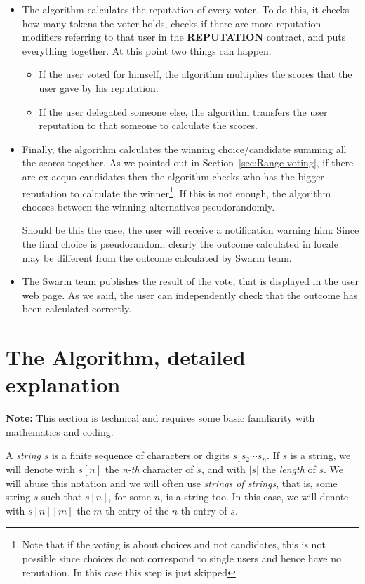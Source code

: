 \documentclass[submission, copyright,creativecommons,sharealike,noncommercial]{eptcs}
\newcommand{\Reputation}{\textbf{REPUTATION}\xspace}
\begin{document}
\begin{itemize}
			\item The algorithm calculates the reputation of every voter. To do this, it checks how many tokens the voter holds, checks if there are more reputation modifiers referring to that user in the \Reputation contract, and puts everything together. At this point two things can happen:
			\begin{itemize}
				\item If the user voted for himself, the algorithm multiplies the scores that the user gave by his reputation.
				
				\item If the user delegated someone else, the algorithm transfers the user reputation to that someone to calculate the scores.
			\end{itemize}
		
			\item Finally, the algorithm calculates the winning choice/candidate summing all the scores together. As we pointed out in Section~\ref{sec:Range voting}, if there are ex-aequo candidates then the algorithm checks who has the bigger reputation to calculate the winner\footnote{Note that if the voting is about choices and not candidates, this is not possible since choices do not correspond to single users and hence have no reputation. In this case this step is just skipped}. If this is not enough, the algorithm chooses between the winning alternatives pseudorandomly.
			
			Should be this the case, the user will receive a notification warning him: Since the final choice is pseudorandom, clearly the outcome calculated in locale may be different from the outcome calculated by Swarm team.
			
			\item The Swarm team publishes the result of the vote, that is displayed in the user web page. As we said, the user can independently check that the outcome has been calculated correctly.
		\end{itemize}


\section{The Algorithm, detailed explanation}
	\textbf{Note:} This section is technical and requires some basic familiarity with mathematics and coding. 

	\begin{definition}
		A \emph{string} $s$ is a finite sequence of characters or digits $s_1 s_2 \cdots s_n$. If $s$ is a string, we will denote with $s[n]$ the \emph{n-th} character of $s$, and with $|s|$ the \emph{length} of $s$. We will abuse this notation and we will often use \emph{strings of strings}, that is, some string $s$ such that $s[n]$, for some $n$, is a string too. In this case, we will denote with $s[n][m]$ the $m$-th entry of the $n$-th entry of $s$.
	\end{definition}	
	
\end{document}

